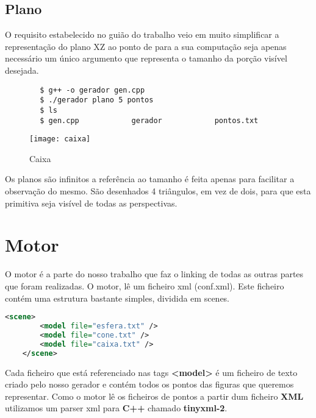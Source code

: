 \documentclass{article}
\begin{document}
\subsection{Plano}
O requisito estabelecido no guião do trabalho veio em muito simplificar a representação do plano XZ ao ponto de para a sua computação seja apenas necessário um único argumento que representa o tamanho da porção visível desejada.  

\begin{commandline}
    \begin{verbatim}
        $ g++ -o gerador gen.cpp
        $ ./gerador plano 5 pontos
        $ ls
        $ gen.cpp            gerador            pontos.txt
    \end{verbatim}
\end{commandline}

\begin{figure}[H]
	\centering
	\texttt{[image: caixa]}
	\caption{Caixa}
\end{figure}

\begin{warn}[Notice:]
Os planos são infinitos a referência ao tamanho é feita apenas para facilitar a observação do mesmo.
São desenhados 4 triângulos, em vez de dois, para que esta primitiva seja visível de todas as perspectivas.
\end{warn}

\newpage
\section{Motor}
O motor é a parte do nosso trabalho que faz o linking de todas as outras partes que foram realizadas. O motor, lê um ficheiro xml (conf.xml). Este ficheiro contém uma estrutura bastante simples, dividida em scenes.

\begin{file}
	\begin{lstlisting}[language=XML]
	<scene>
		<model file="esfera.txt" />
		<model file="cone.txt" />
		<model file="caixa.txt" />
	</scene>
	\end{lstlisting}
	\end{file}

Cada ficheiro que está referenciado nas tags \textbf{<model>} é um ficheiro de texto criado pelo nosso gerador e contém todos os pontos das figuras que queremos representar.
Como o motor lê os ficheiros de pontos a partir dum ficheiro \textbf{XML} utilizamos um parser xml para \textbf{C++} chamado \textbf{tinyxml-2}.
\end{document}
